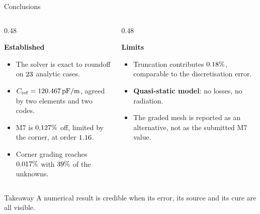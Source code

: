 \documentclass[aspectratio=169,10pt]{beamer}
\newenvironment{plainsection}[1]{%
  \par\vspace{0.6ex}\begingroup\footnotesize
  {\small\bfseries #1\par}\vspace{0.45ex}%
}{\par\endgroup\vspace{0.8ex}}
\begin{document}
\begin{frame}{Conclusions}
  \begin{columns}[T]
    \begin{column}{0.48\textwidth}
      \begin{plainsection}{Established}
        \begin{itemize}
          \item The solver is exact to roundoff on $23$ analytic cases.
          \item $C_{\rm ref}=120.467\,\mathrm{pF/m}$, agreed by two elements and
                two codes.
          \item M7 is $0.127\%$ off, limited by the corner, at order $1.16$.
          \item Corner grading reaches $0.017\%$ with $39\%$ of the unknowns.
        \end{itemize}
      \end{plainsection}
    \end{column}
    \begin{column}{0.48\textwidth}
      \begin{plainsection}{Limits}
        \begin{itemize}
          \item Truncation contributes $0.18\%$, comparable to the
                discretisation error.
          \item \textbf{Quasi-static model}: no losses, no radiation.
          \item The graded mesh is reported as an alternative, not as the
                submitted M7 value.
        \end{itemize}
      \end{plainsection}
    \end{column}
  \end{columns}
  \begin{alertblock}{Takeaway}
    A numerical result is credible when its error, its source and its cure are all visible.
  \end{alertblock}
\end{frame}
\end{document}
